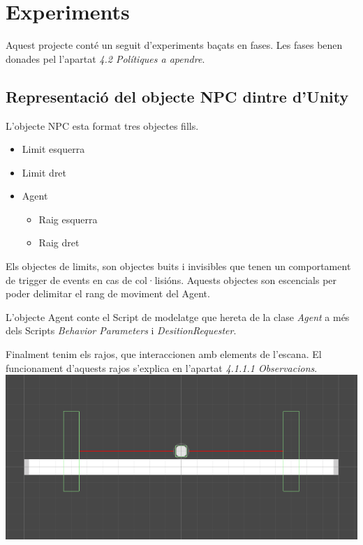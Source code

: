 \documentclass{article}
\begin{document}
    \newpage
    
    \section{Experiments}
    
    Aquest projecte conté un seguit d'experiments baçats en fases.
    Les fases benen donades pel l'apartat \textit{4.2 Polítiques a apendre}.
    
    \subsection{ Representació del objecte NPC dintre d'Unity }
    L'objecte NPC esta format tres objectes fills.
    
    \begin{itemize}
        \item Limit esquerra
        \item Limit dret
        \item Agent
        \begin{itemize}
            \item Raig esquerra
            \item Raig dret
        \end{itemize}
    \end{itemize}

    Els objectes de limits, son objectes buits i invisibles que tenen un comportament de trigger de events en cas de col·lisións. Aquests objectes son escencials per poder delimitar el rang de moviment del Agent.
    
    L'objecte Agent conte el Script de modelatge que hereta de la clase \textit{Agent} a més dels Scripts \textit{Behavior Parameters} i \textit{DesitionRequester}. 
    
    Finalment tenim els rajos, que interaccionen amb elements de l'escana. El funcionament d'aquests rajos s'explica en l'apartat \textit{4.1.1.1 Observacions}. \\
    
    \includegraphics[width=\textwidth]{images/NPC_scene.png} 
    
\end{document}
